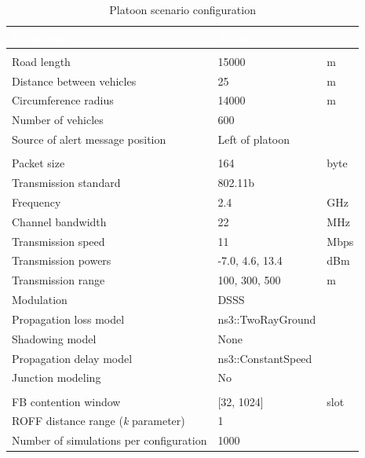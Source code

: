		\begin{table}[H]
			\def\arraystretch{1.1}
			\begin{tabularx}{\textwidth}{l | l  l}
				\rowcolor{I} {\large \textcolor{white}{Parameter}} & {\large \textcolor{white}{Value}} & {\large \textcolor{white}{}} \TBstrut  \\
				\toprule
				\endhead
				\rowcolor{P} \multicolumn{3}{c}{Scenario configuration} \\
				\midrule[1pt]
				Road length 							& 15000 				& m		\\
				Distance between vehicles 				& 25					& m		\\
				Circumference	radius					& 14000					& m		\\
				Number of vehicles						& 600					& 		\\
				Source of alert message position		& Left of platoon		&		\\
				\midrule[1pt]
				\rowcolor{P} \multicolumn{3}{c}{Network configuration} \\
				\midrule[1pt]
				Packet size								& 164					& byte	\\	
				Transmission standard					& 802.11b				&		\\
				Frequency								& 2.4					& GHz	\\
				Channel bandwidth						& 22					& MHz	\\
				Transmission speed						& 11					& Mbps	\\
				Transmission powers						& -7.0, 4.6, 13.4		& dBm	\\
				Transmission range						& 100, 300, 500			& m		\\
				Modulation								& DSSS					& 		\\
				Propagation loss model					& ns3::TwoRayGround 	&		\\
				Shadowing model							& None					&		\\
				Propagation delay model					& ns3::ConstantSpeed	&		\\
				Junction modeling						& No					&		\\
				\midrule[1pt]
				\rowcolor{P} \multicolumn{3}{c}{Protocols configuration} \\
				\midrule[1pt]
				FB contention window					& [32, 1024]			& slot	\\
				ROFF distance range (\textit{k} parameter) & 1					&		\\	
				\midrule[1pt]
				Number of simulations per configuration	& 1000					&		\\
				\bottomrule
			\end{tabularx}
			\label{table:platoon}
			\caption{Platoon scenario configuration}
		\end{table}
	
